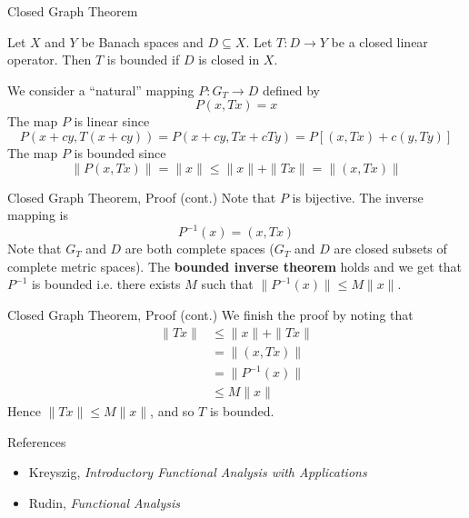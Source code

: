 \documentclass[10pt]{beamer}
\begin{document}
		\begin{frame}{Closed Graph Theorem}
				\begin{theorem}
						Let $X$ and $Y$ be Banach spaces and $D \subseteq X$. Let $T: D\to Y$ be a closed linear operator. Then $T$ is bounded if $D$ is closed in $X$.
				\end{theorem}
				We consider a ``natural'' mapping $P: G_T \to D$ defined by 
				\begin{equation*}
						P(x, Tx) = x
				\end{equation*}
				The map $P$ is linear since 
				\begin{equation*}
						P(x + cy, T(x + cy)) = P(x + cy, Tx + cTy) = P[(x, Tx) + c(y, Ty)] 
				\end{equation*}
				The map $P$ is bounded since 
				\begin{equation*}
						\|P(x, Tx)\| = \|x\| \leq \|x\| + \|Tx\| = \|(x, Tx)\|
				\end{equation*}
		\end{frame}

		\begin{frame}{Closed Graph Theorem, Proof (cont.)}
				Note that $P$ is bijective. The inverse mapping is 
				\begin{equation*}
						P^{-1}(x) = (x, Tx)
				\end{equation*}
				Note that $G_T$ and $D$ are both complete spaces ($G_T$ and $D$ are closed subsets of complete metric spaces). The \textbf{bounded inverse theorem} holds and we get that $P^{-1}$ is bounded i.e. there exists $M$ such that $\|P^{-1}(x)\| \leq M\|x\|$. \par 
		\end{frame}

		\begin{frame}{Closed Graph Theorem, Proof (cont.)}
				We finish the proof by noting that 
				\begin{align*}
						\|Tx\| &\leq \|x\| + \|Tx\| \\ 
									 &= \|(x, Tx)\| \\ 
									 &= \|P^{-1}(x)\| \\ 
									 &\leq M\|x\|
				\end{align*}
				Hence $\|Tx\| \leq M\|x\|$, and so $T$ is bounded. 
		\end{frame}

		\begin{frame}{References}
				\begin{itemize}
						\item Kreyszig, \emph{Introductory Functional Analysis with Applications} 
						\item Rudin, \emph{Functional Analysis}
				\end{itemize}
		\end{frame}
\end{document}
